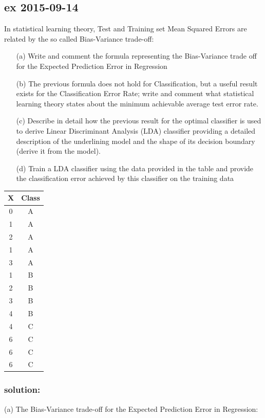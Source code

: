 \documentclass[a4paper,12pt,titlepage]{article} %
\begin{document}
\subsection{ex 2015-09-14}
In statistical learning theory, Test and Training set Mean Squared Errors are related by the so called Bias-Variance trade-off:
\begin{itemize}
\item[(a)] Write and comment the formula representing the Bias-Variance trade off for the Expected Prediction Error in Regression
\item[(b)] The previous formula does not hold for Classification, but a useful result exists for the Classification Error Rate; write and comment what statistical learning theory states about the minimum achievable average test error rate.
\item[(c)] Describe in detail how the previous result for the optimal classifier is used to derive Linear Discriminant Analysis (LDA) classifier providing a detailed description of the underlining model and the shape of its decision boundary (derive it from the model).
\item[(d)] Train a LDA classifier using the data provided in the table and provide the classification error achieved by this classifier on the training data
\end{itemize}

\begin{center}
  \begin{tabular}{c|c}
    X & Class \\
    \hline
    \hline
    0 & A \\
    1 & A \\
    2 & A \\
    1 & A \\
    3 & A \\
    \hline
    1 & B \\
    2 & B \\
    3 & B \\
    4 & B \\
    \hline
    4 & C \\
    6 & C \\
    6 & C \\
    6 & C \\
    \hline
  \end{tabular}
\end{center}

\subsubsection{solution:}
(a) The Bias-Variance trade-off for the Expected Prediction Error in Regression:\\
\end{document}
